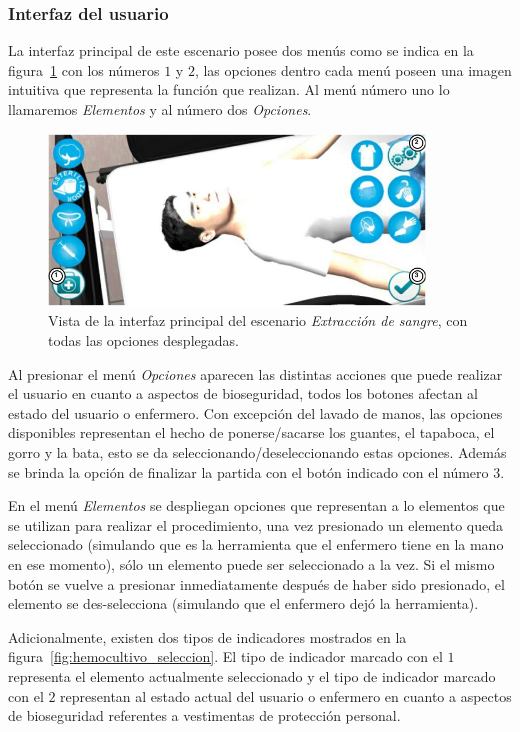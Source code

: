 \subsubsection{Interfaz del usuario}

La interfaz principal de este escenario posee dos menús como se indica en la
figura~\ref{fig:hemocultivo_gui} con los números $1$ y $2$, las opciones dentro
cada menú poseen una imagen intuitiva que representa la función que realizan. Al
menú número uno lo llamaremos \emph{Elementos} y al número dos \emph{Opciones}.

\begin{figure}[H]
\centering
\includegraphics[width=10cm]{solucion/images/hemocultivo_menus.jpg}
\caption{Vista de la interfaz principal del escenario \emph{Extracción de
        sangre}, con todas las opciones desplegadas.}
\label{fig:hemocultivo_gui}
\end{figure}


Al presionar el menú \emph{Opciones} aparecen las distintas acciones que puede
realizar el usuario en cuanto a aspectos de bioseguridad, todos los botones
afectan al estado del usuario o enfermero. Con excepción del lavado de manos,
las opciones disponibles representan el hecho de ponerse/sacarse los guantes, el
tapaboca, el gorro y la bata, esto se da seleccionando/deseleccionando estas
opciones. Además se brinda la opción de finalizar la partida con el botón
indicado con el número $3$.


En el menú \emph{Elementos} se despliegan opciones que representan a lo
elementos que se utilizan para realizar el procedimiento, una vez presionado un
elemento queda seleccionado (simulando que es la herramienta que el enfermero
tiene en la mano en ese momento), sólo un elemento puede ser seleccionado a la
vez. Si el mismo botón se vuelve a presionar inmediatamente después de haber
sido presionado, el elemento se des-selecciona (simulando que el enfermero dejó
la herramienta).


Adicionalmente, existen dos tipos de indicadores mostrados en la
figura~\ref{fig:hemocultivo_seleccion}. El tipo de indicador marcado con el $1$
representa el elemento actualmente seleccionado y el tipo de indicador marcado
con el $2$ representan al estado actual del usuario o enfermero en cuanto a
aspectos de bioseguridad referentes a vestimentas de protección personal.

